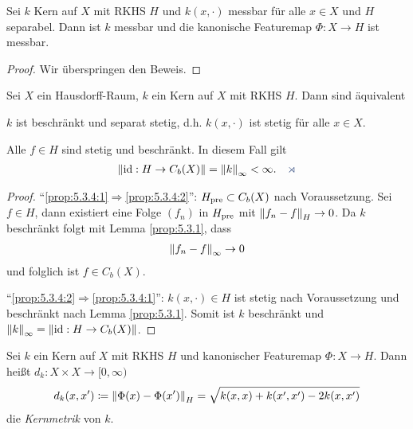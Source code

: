 \begin{lem}
\label{prop:5.3.3}
Sei $k$ Kern auf $X$ mit RKHS $H$ und $k(x,\cdot)$ messbar für alle $x\in X$ und
$H$ separabel. Dann ist $k$ messbar und die kanonische Featuremap $\Phi: X\to H$
ist messbar.\fishhere
\end{lem}
\begin{proof}
Wir überspringen den Beweis.\qedhere
\end{proof}

\begin{lem}
\label{prop:5.3.4}
Sei $X$ ein Hausdorff-Raum, $k$ ein Kern auf $X$ mit RKHS $H$. Dann sind
äquivalent
\begin{equivenum}
\item\label{prop:5.3.4:1} $k$ ist beschränkt und separat stetig, d.h.
$k(x,\cdot)$ ist stetig für alle $x\in X$.
\item\label{prop:5.3.4:2} Alle $f\in H$ sind stetig und beschränkt. In diesem
Fall gilt
\begin{align*}
\norm{\id: H\to C_b(X)} = \norm{k}_\infty < \infty.\fishhere
\end{align*}
\end{equivenum}
\end{lem}
\begin{proof}
"`\ref{prop:5.3.4:1}$\Rightarrow$\ref{prop:5.3.4:2}"': $H_{\mathrm{pre}} \subset C_b(X)$
nach Voraussetzung. Sei $f\in H$, dann existiert eine Folge $(f_n)$ in $H_{\mathrm{pre}}$
mit $\left\|f_n-f\right\|_H \to 0$. Da $k$ beschränkt folgt mit Lemma
\ref{prop:5.3.1}, dass
\begin{align*}
\left\|f_n-f\right\|_\infty \to 0
\end{align*}
und folglich ist $f\in C_b(X)$.

"`\ref{prop:5.3.4:2}$\Rightarrow$\ref{prop:5.3.4:1}"': $k(x,\cdot)\in H$ ist
stetig nach Voraussetzung und beschränkt nach Lemma \ref{prop:5.3.1}. Somit ist
$k$ beschränkt und $\left\|k\right\|_\infty = \left\|\operatorname{id}: H\to C_b(X)\right\|$.\qedhere

\end{proof}

\begin{defn}
\label{defn:5.3.5}
Sei $k$ ein Kern auf $X$ mit RKHS $H$ und kanonischer Featuremap $\Phi: X\to H$.
Dann heißt $d_k: X\times X\to [0,\infty)$
\begin{align*}
d_k(x,x') \coloneq \left\|\Phi(x)-\Phi(x')\right\|_H
= \sqrt{k(x,x)+k(x',x')-2k(x,x')}
\end{align*}
die \emph{Kernmetrik} von $k$.\fishhere
\end{defn}

